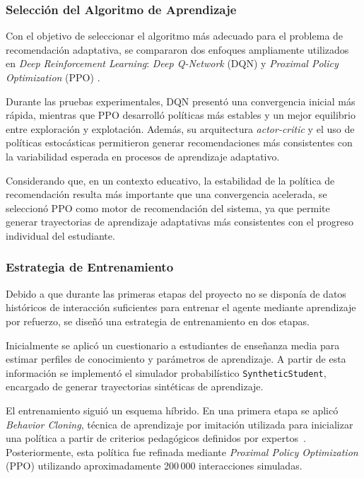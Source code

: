 \documentclass[conference]{IEEEtran}
\begin{document}
\subsubsection{Selección del Algoritmo de Aprendizaje}

Con el objetivo de seleccionar el algoritmo más adecuado para el problema de recomendación adaptativa, se compararon dos enfoques ampliamente utilizados en \textit{Deep Reinforcement Learning}: \textit{Deep Q-Network} (DQN) \cite{mnih2015dqn} y \textit{Proximal Policy Optimization} (PPO) \cite{schulman2017ppo}.

Durante las pruebas experimentales, DQN presentó una convergencia inicial más rápida, mientras que PPO desarrolló políticas más estables y un mejor equilibrio entre exploración y explotación. Además, su arquitectura \textit{actor-critic} y el uso de políticas estocásticas permitieron generar recomendaciones más consistentes con la variabilidad esperada en procesos de aprendizaje adaptativo.

Considerando que, en un contexto educativo, la estabilidad de la política de recomendación resulta más importante que una convergencia acelerada, se seleccionó PPO como motor de recomendación del sistema, ya que permite generar trayectorias de aprendizaje adaptativas más consistentes con el progreso individual del estudiante.

\subsubsection{Estrategia de Entrenamiento}

Debido a que durante las primeras etapas del proyecto no se disponía de datos históricos de interacción suficientes para entrenar el agente mediante aprendizaje por refuerzo, se diseñó una estrategia de entrenamiento en dos etapas.

Inicialmente se aplicó un cuestionario a estudiantes de enseñanza media para estimar perfiles de conocimiento y parámetros de aprendizaje. A partir de esta información se implementó el simulador probabilístico \texttt{SyntheticStudent}, encargado de generar trayectorias sintéticas de aprendizaje.

El entrenamiento siguió un esquema híbrido. En una primera etapa se aplicó \textit{Behavior Cloning}, técnica de aprendizaje por imitación utilizada para inicializar una política a partir de criterios pedagógicos definidos por expertos~\cite{osa2018imitation}. Posteriormente, esta política fue refinada mediante \textit{Proximal Policy Optimization} (PPO) utilizando aproximadamente 200\,000 interacciones simuladas.
\end{document}
